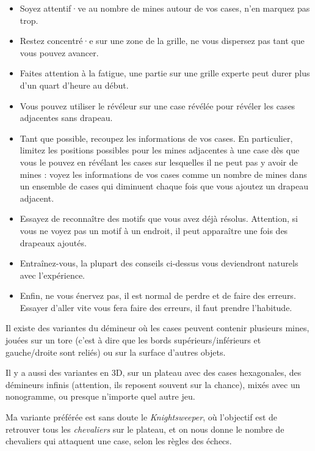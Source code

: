 \begin{itemize}
    \item Soyez attentif·ve au nombre de mines autour de vos cases, n'en marquez pas trop. 
    \item Restez concentré·e sur une zone de la grille, ne vous dispersez pas tant que vous pouvez avancer. 
    \item Faites attention à la fatigue, une partie sur une grille experte peut durer plus d'un quart d'heure au début.
    \item Vous pouvez utiliser le révéleur sur une case révélée pour révéler les cases adjacentes sans drapeau. 
    \item Tant que possible, recoupez les informations de vos cases. En particulier, limitez les positions possibles
pour les mines adjacentes à une case dès que vous le pouvez en révélant les cases sur lesquelles il ne peut pas y avoir
de mines : voyez les informations de vos cases comme un nombre de mines dans un ensemble de cases qui diminuent chaque
fois que vous ajoutez un drapeau adjacent.
    \item Essayez de reconnaître des motifs que vous avez déjà résolus. Attention, si vous ne voyez pas un motif à
un endroit, il peut apparaître une fois des drapeaux ajoutés. 
    \item Entraînez-vous, la plupart des conseils ci-dessus vous deviendront naturels avec l'expérience.
    \item Enfin, ne vous énervez pas, il est normal de perdre et de faire des erreurs. Essayer d'aller vite vous fera
faire des erreurs, il faut prendre l'habitude.
\end{itemize}



Il existe des variantes du démineur où les cases peuvent contenir plusieurs mines, jouées sur un tore (c'est à dire que
les bords supérieurs/inférieurs et gauche/droite sont reliés) ou sur la surface d'autres objets.

Il y a aussi des variantes en 3D, sur un plateau avec des cases hexagonales, des démineurs infinis (attention, ils
reposent souvent sur la chance), mixés avec un nonogramme, ou presque n'importe quel autre jeu. 

Ma variante préférée est sans doute le \emph{Knightsweeper}, où l'objectif est de retrouver tous les
\textit{chevaliers} sur le plateau, et on nous donne le nombre de chevaliers qui attaquent une case, selon les règles
des échecs.

\signature{Pandada}
